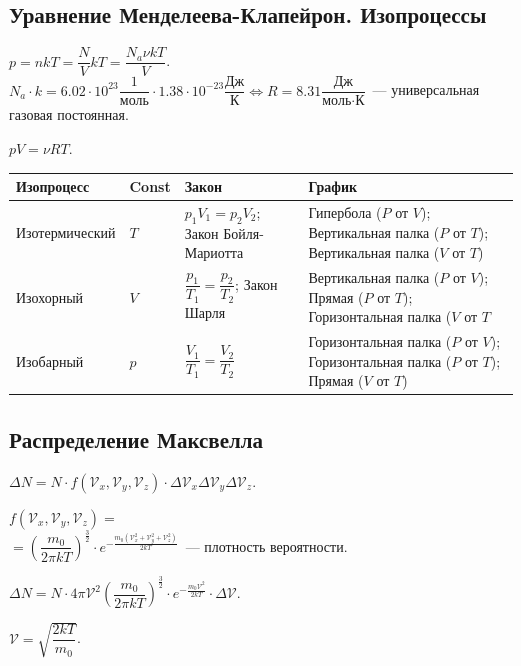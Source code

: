 \documentclass[12pt]{article}
\begin{document}
	\subsection{Уравнение Менделеева-Клапейрон. Изопроцессы}
	$p = nkT = \dfrac{N}{V}kT = \dfrac{N_a \nu kT}{V}$. $N_a \cdot k = 6.02 \cdot 10^{23} \dfrac{1}{\text{моль}} \cdot 1.38 \cdot 10^{-23} \dfrac{\text{Дж}}{\text{К}} \Leftrightarrow R = 8.31 \dfrac{\text{Дж}}{\text{моль} \cdot \text{К}}$~--- универсальная газовая постоянная.\\
	\begin{definition}
		$pV = \nu RT$.
	\end{definition}
	\begin{xltabular}{\textwidth}{|X|X|X|X|}
		\hline
		Изопроцесс & Const & Закон & График\\
		\hline
		Изотермический & $T$ & $p_1V_1 = p_2V_2$; Закон Бойля-Мариотта & Гипербола ($P$ от $V$); Вертикальная палка ($P$ от $T$); Вертикальная палка ($V$ от $T$)\\
		\hline
		Изохорный & $V$ & $\dfrac{p_1}{T_1} = \dfrac{p_2}{T_2}$; Закон Шарля & Вертикальная палка ($P$ от $V$); Прямая ($P$ от $T$); Горизонтальная палка ($V$ от $T$\\
		\hline
		Изобарный & $p$ & $\dfrac{V_1}{T_1} = \dfrac{V_2}{T_2}$ & Горизонтальная палка ($P$ от $V$); Горизонтальная палка ($P$ от $T$); Прямая ($V$ от $T$)\\
		\hline
	\end{xltabular}
	\subsection{Распределение Максвелла}
	\begin{definition}
		$\varDelta N = N \cdot f(\mathcal{V}_x, \mathcal{V}_y, \mathcal{V}_z) \cdot \varDelta \mathcal{V}_x \varDelta \mathcal{V}_y \varDelta \mathcal{V}_z$.
	\end{definition}
	\begin{definition}
		$f(\mathcal{V}_x, \mathcal{V}_y, \mathcal{V}_z) =$\\
		$= \left( \dfrac{m_0}{2 \pi kT} \right)^{\frac{3}{2}} \cdot e^{- \frac{m_0(\mathcal{V}_x^2 + \mathcal{V}_y^2 + \mathcal{V}_z^2)}{2kT}}$~--- плотность вероятности.
	\end{definition}
	\begin{definition}
		$\varDelta N = N \cdot 4 \pi \mathcal{V}^2 \left( \dfrac{m_0}{2 \pi kT} \right)^{\frac{3}{2}} \cdot e^{- \frac{m_0\mathcal{V}^2}{2kT}} \cdot \varDelta \mathcal{V}$.
	\end{definition}
	\begin{definition}
		$\mathcal{V} = \sqrt{\dfrac{2kT}{m_0}}$.
	\end{definition}
\end{document}
